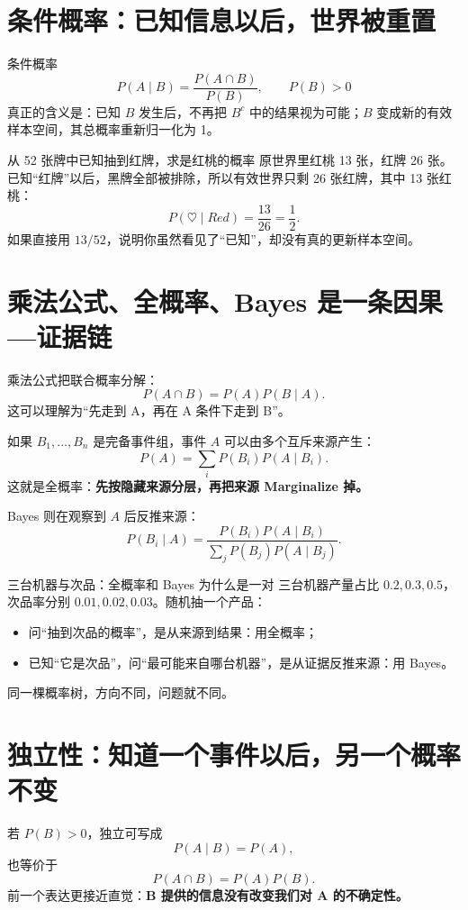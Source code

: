 \documentclass[11pt,a4paper,openany]{ctexbook}
\newcommand{\key}[1]{\textbf{\color{deep}#1}}
\begin{document}
\section{条件概率：已知信息以后，世界被重置}
条件概率
\[
P(A\mid B)=\frac{P(A\cap B)}{P(B)},\qquad P(B)>0
\]
真正的含义是：已知 $B$ 发生后，不再把 $B^c$ 中的结果视为可能；$B$ 变成新的有效样本空间，其总概率重新归一化为 1。

\begin{examplebox}{从 52 张牌中已知抽到红牌，求是红桃的概率}
原世界里红桃 13 张，红牌 26 张。已知“红牌”以后，黑牌全部被排除，所以有效世界只剩 26 张红牌，其中 13 张红桃：
\[
P(\heartsuit\mid Red)=\frac{13}{26}=\frac12.
\]
如果直接用 $13/52$，说明你虽然看见了“已知”，却没有真的更新样本空间。
\end{examplebox}

\section{乘法公式、全概率、Bayes 是一条因果—证据链}
乘法公式把联合概率分解：
\[
P(A\cap B)=P(A)P(B\mid A).
\]
这可以理解为“先走到 A，再在 A 条件下走到 B”。

如果 $B_1,\dots,B_n$ 是完备事件组，事件 $A$ 可以由多个互斥来源产生：
\[
P(A)=\sum_iP(B_i)P(A\mid B_i).
\]
这就是全概率：\key{先按隐藏来源分层，再把来源 Marginalize 掉。}

Bayes 则在观察到 $A$ 后反推来源：
\[
P(B_i\mid A)=\frac{P(B_i)P(A\mid B_i)}{\sum_jP(B_j)P(A\mid B_j)}.
\]

\begin{examplebox}{三台机器与次品：全概率和 Bayes 为什么是一对}
三台机器产量占比 $0.2,0.3,0.5$，次品率分别 $0.01,0.02,0.03$。随机抽一个产品：
\begin{itemize}
  \item 问“抽到次品的概率”，是从来源到结果：用全概率；
  \item 已知“它是次品”，问“最可能来自哪台机器”，是从证据反推来源：用 Bayes。
\end{itemize}
同一棵概率树，方向不同，问题就不同。
\end{examplebox}

\section{独立性：知道一个事件以后，另一个概率不变}
若 $P(B)>0$，独立可写成
\[
P(A\mid B)=P(A),
\]
也等价于
\[
P(A\cap B)=P(A)P(B).
\]
前一个表达更接近直觉：\key{B 提供的信息没有改变我们对 A 的不确定性。}
\end{document}
